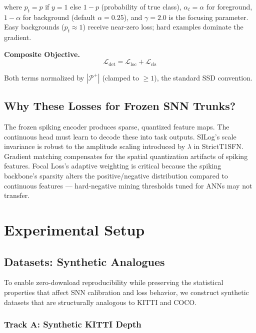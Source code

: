 \documentclass[10pt,conference]{IEEEtran}
\begin{document}
where $p_t = p$ if $y=1$ else $1-p$ (probability of true class), $\alpha_t = \alpha$ for foreground, $1-\alpha$ for background (default $\alpha=0.25$), and $\gamma=2.0$ is the focusing parameter. Easy backgrounds ($p_t \approx 1$) receive near-zero loss; hard examples dominate the gradient.

\textbf{Composite Objective.}
\begin{equation}
    \mathcal{L}_{\text{det}} = \mathcal{L}_{\text{loc}} + \mathcal{L}_{\text{cls}}
\end{equation}

Both terms normalized by $|\mathcal{P}^+|$ (clamped to $\ge 1$), the standard SSD convention.

\subsection{Why These Losses for Frozen SNN Trunks?}

The frozen spiking encoder produces sparse, quantized feature maps. The continuous head must learn to decode these into task outputs. SILog's scale invariance is robust to the amplitude scaling introduced by $\lambda$ in StrictT1SFN. Gradient matching compensates for the spatial quantization artifacts of spiking features. Focal Loss's adaptive weighting is critical because the spiking backbone's sparsity alters the positive/negative distribution compared to continuous features — hard-negative mining thresholds tuned for ANNs may not transfer.


\section{Experimental Setup}
\label{sec:experimental_setup}

\subsection{Datasets: Synthetic Analogues}

To enable zero-download reproducibility while preserving the statistical properties that affect SNN calibration and loss behavior, we construct synthetic datasets that are structurally analogous to KITTI and COCO.

\subsubsection{Track A: Synthetic KITTI Depth}
\label{sec:synth_kitti}
\end{document}
